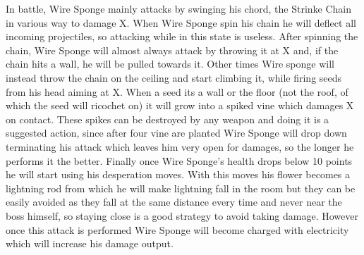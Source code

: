 In battle, Wire Sponge mainly attacks by swinging his chord, the Strinke Chain in various way to damage X.
When Wire Sponge spin his chain he will deflect all incoming projectiles, so attacking while in this state is useless. After spinning the chain, Wire Sponge will almost always attack by throwing it at X and, if the chain hits a wall, he will be pulled towards it. Other times Wire sponge will instead throw the chain on the ceiling and start climbing it, while firing seeds from his head aiming at X. When a seed its a wall or the floor (not the roof, of which the seed will ricochet on) it will grow into a spiked vine which damages X on contact. These spikes can be destroyed by any weapon and doing it is a suggested action, since after four vine are planted Wire Sponge will drop down~\cite{rta:x2} terminating his attack which leaves him very open for damages, so the longer he performs it the better. Finally once Wire Sponge's health drops below 10 points he will start using his desperation moves. With this moves his flower becomes a lightning rod from which he will make lightning fall in the room but they can be easily avoided as they fall at the same distance every time and never near the boss himself, so staying close is a good strategy to avoid taking damage. However once this attack is performed Wire Sponge will become charged with electricity which will increase his damage output.

